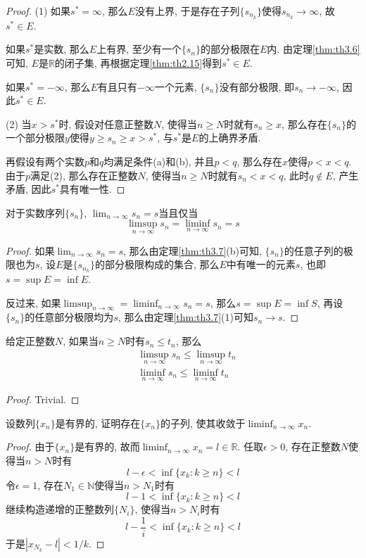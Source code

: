 \documentclass[cn,12pt,math=mtpro2,citestyle=gb7714-2015,bibstyle=gb7714-2015,twocol]{elegantbook}
\newcommand{\R}{\mathbb{R}}
\newcommand{\limn}{\lim_{n\to\infty}}
\begin{document}
\begin{proof}
  (1) 如果$s^\ast=\infty$, 那么$E$没有上界, 于是存在子列$\{s_{n_k}\}$使得$s_{n_k}\rightarrow\infty$, 故$s^\ast\in E$.

  如果$s^\ast$是实数, 那么$E$上有界, 至少有一个$\{s_n\}$的部分极限在$E$内. 由定理\ref{thm:th3.6}可知, $E$是$\R$的闭子集, 再根据定理\ref{thm:th2.15}得到$s^\ast\in E$.

  如果$s^\ast=-\infty$, 那么$E$有且只有$-\infty$一个元素, $\{s_n\}$没有部分极限, 即$s_n\rightarrow -\infty$, 因此$s^\ast\in E$.

  (2) 当$x>s^\ast$时, 假设对任意正整数$N$, 使得当$n\geq N$时就有$s_n\geq x$, 那么存在$\{s_n\}$的一个部分极限$y$使得$y\geq s_n\geq x>s^\ast$, 与$s^\ast$是$E$的上确界矛盾.

  再假设有两个实数$p$和$q$均满足条件(a)和(b), 并且$p<q$, 那么存在$x$使得$p<x<q$. 由于$p$满足(2), 那么存在正整数$N$, 使得当$n\geq N$时就有$s_n<x<q$, 此时$q\notin E$, 产生矛盾, 因此$s^\ast$具有唯一性.


\end{proof}
\begin{theorem}
  对于实数序列$\{s_n\}$, $\displaystyle\limn  s_n=s$当且仅当
  $$\limsup_{n\to\infty} s_n=\liminf_{n\to\infty} s_n=s$$
\end{theorem}
\begin{proof}
  如果$\limn  s_n=s$, 那么由定理\ref{thm:th3.7}(b)可知, $\{s_n\}$的任意子列的极限也为$s$, 设$E$是$\{s_{n_k}\}$的部分极限构成的集合, 那么$E$中有唯一的元素$s$, 也即$s=\sup E=\inf E$.

  反过来, 如果$\limsup_{n\to\infty}=\liminf_{n\to\infty} s_n=s$, 那么$s=\sup E=\inf S$, 再设$\{s_n\}$的任意部分极限均为$s$, 那么由定理\ref{thm:th3.7}(1)可知$s_n\rightarrow s$.


\end{proof}

\begin{theorem}\label{thm:th3.11}
  给定正整数$N$, 如果当$n\geq N$时有$s_n\leq t_n$, 那么
  \begin{align*}
  &\limsup_{n\to\infty} s_n\leq \limsup_{n\to\infty} t_n \\
  &\liminf_{n\to\infty} s_n\leq \liminf_{n\to\infty} t_n
  \end{align*}
\end{theorem}
\begin{proof}
  Trivial.
\end{proof}
\begin{example}
设数列$\{x_n\}$是有界的, 证明存在$\{x_n\}$的子列, 使其收敛于$\liminf_{n\to\infty} x_n$.
\end{example}
\begin{proof}
  由于$\{x_n\}$是有界的, 故而$\liminf_{n\to\infty}x_n=l\in \R$. 任取$\epsilon>0$, 存在正整数$N$使得当$n>N$时有
  $$l-\epsilon<\inf\{x_k: k\geq n\}<l$$
  令$\epsilon=1$, 存在$N_1\in\mathbb{N}$使得当$n>N_1$时有
  $$l-1<\inf\{x_k: k\geq n\}<l$$
  继续构造递增的正整数列$\{N_i\}$, 使得当$n>N_i$时有
  $$l-\frac{1}{i}<\inf\{x_k:k\geq n\}<l$$
  于是$|x_{N_k}-l|<1/k$.
\end{proof}
\end{document}
